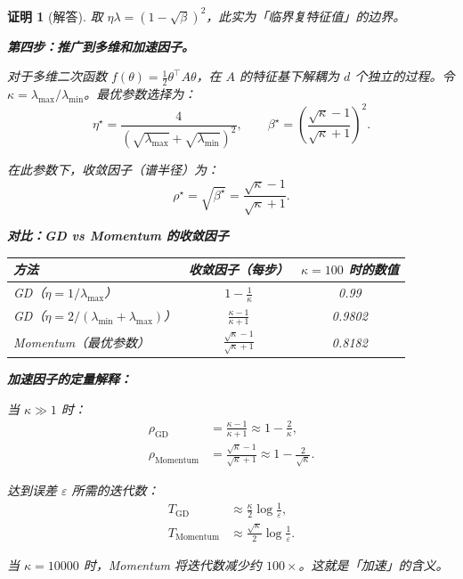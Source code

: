 \documentclass[12pt,a4paper]{ctexart}
\theoremstyle{definition}
\theoremstyle{plain}
\newtheorem*{proof*}{证明}
\newcommand{\eps}{\varepsilon}
\begin{document}
\begin{proof*}[解答]
取 $\eta\lambda = (1 - \sqrt{\beta})^2$，此实为「临界复特征值」的边界。

\medskip
\noindent\textbf{第四步：推广到多维和加速因子。}

对于多维二次函数 $f(\theta) = \frac12\theta^\top A\theta$，在 $A$ 的特征基下解耦为
$d$ 个独立的过程。令 $\kappa = \lambda_{\max}/\lambda_{\min}$。最优参数选择为：
\begin{equation}
  \eta^\star = \frac{4}{(\sqrt{\lambda_{\max}} + \sqrt{\lambda_{\min}})^2},
  \qquad
  \beta^\star = \left(\frac{\sqrt{\kappa} - 1}{\sqrt{\kappa} + 1}\right)^2.
\end{equation}

在此参数下，收敛因子（谱半径）为：
\begin{equation}
  \boxed{\rho^\star = \sqrt{\beta^\star} = \frac{\sqrt{\kappa} - 1}{\sqrt{\kappa} + 1}.}
\end{equation}

\medskip
\noindent\textbf{对比：GD vs Momentum 的收敛因子}

\begin{center}
\begin{tabular}{lcc}
\toprule
方法 & 收敛因子（每步） & $\kappa=100$ 时的数值 \\
\midrule
GD（$\eta = 1/\lambda_{\max}$） & $1 - \frac{1}{\kappa}$ & 0.99 \\
GD（$\eta = 2/(\lambda_{\min} + \lambda_{\max})$） & $\frac{\kappa-1}{\kappa+1}$ & 0.9802 \\
Momentum（最优参数） & $\frac{\sqrt{\kappa}-1}{\sqrt{\kappa}+1}$ & 0.8182 \\
\bottomrule
\end{tabular}
\end{center}

\medskip
\textbf{加速因子的定量解释：}

当 $\kappa \gg 1$ 时：
\begin{align}
  \rho_{\text{GD}} &= \frac{\kappa-1}{\kappa+1}
    \approx 1 - \frac{2}{\kappa}, \\[4pt]
  \rho_{\text{Momentum}} &= \frac{\sqrt{\kappa}-1}{\sqrt{\kappa}+1}
    \approx 1 - \frac{2}{\sqrt{\kappa}}.
\end{align}

达到误差 $\eps$ 所需的迭代数：
\begin{align}
  T_{\text{GD}} &\approx \frac{\kappa}{2} \log\frac{1}{\eps}, \\[4pt]
  T_{\text{Momentum}} &\approx \frac{\sqrt{\kappa}}{2} \log\frac{1}{\eps}.
\end{align}

当 $\kappa = 10000$ 时，Momentum 将迭代数减少约 $100\times$。这就是「加速」的含义。

\end{proof*}
\end{document}
